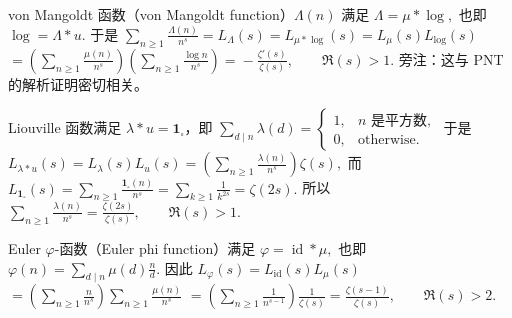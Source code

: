 \begin{example}
	von Mangoldt 函数（von Mangoldt function）$\Lambda(n)$ 满足
	\(\textstyle \Lambda=\allowbreak{}\mu*\log,\allowbreak{}\)
	也即
	\(\textstyle \log=\allowbreak{}\Lambda*u.\)
	于是
	\(\textstyle \sum_{n\geq\allowbreak{} 1}\frac{\Lambda(n)}{n^s} =\allowbreak{} L_\Lambda(s) =\allowbreak{} L_{\mu*\log}(s) =\allowbreak{} L_\mu(s)L_{\log}(s)\) \(\textstyle =\allowbreak{} \left(\sum_{n\geq\allowbreak{} 1}\frac{\mu(n)}{n^s}\right) \left(\sum_{n\geq\allowbreak{} 1}\frac{\log n}{n^s}\right) =\allowbreak{} -\frac{\zeta'(s)}{\zeta(s)},\allowbreak{} \qquad \Re(s)>1.\)
	旁注：这与 PNT 的解析证明密切相关。
\end{example}

\begin{example}
	Liouville 函数满足 $\lambda*u=\mathbf 1_{\square}$，即
	\(\textstyle \sum_{d\mid n}\lambda(d) = \begin{cases} 1, & n\text{ 是平方数},\\ 0, & \text{otherwise}. \end{cases}\)
	于是
	\(\textstyle L_{\lambda*u}(s)=\allowbreak{}L_\lambda(s)L_u(s) =\allowbreak{} \left(\sum_{n\geq\allowbreak{} 1}\frac{\lambda(n)}{n^s}\right)\zeta(s),\allowbreak{}\)
	而
	\(\textstyle L_{\mathbf 1_{\square}}(s) =\allowbreak{} \sum_{n\geq\allowbreak{} 1}\frac{\mathbf 1_{\square}(n)}{n^s} =\allowbreak{} \sum_{k\geq\allowbreak{} 1}\frac1{k^{2s}} =\allowbreak{} \zeta(2s).\)
	所以
	\(\textstyle \sum_{n\geq\allowbreak{} 1}\frac{\lambda(n)}{n^s} =\allowbreak{} \frac{\zeta(2s)}{\zeta(s)},\allowbreak{} \qquad \Re(s)>1.\)
\end{example}

\begin{example}
	Euler $\varphi$-函数（Euler phi function）满足
	\(\textstyle \varphi=\allowbreak{}\operatorname{id}*\mu,\allowbreak{}\)
	也即
	\(\textstyle \varphi(n)=\allowbreak{}\sum_{d\mid\allowbreak{} n}\mu(d)\frac{n}{d}.\)
	因此
	\(\textstyle L_\varphi(s) =\allowbreak{} L_{\operatorname{id}}(s)L_\mu(s)\) \(\textstyle =\allowbreak{} \left(\sum_{n\geq\allowbreak{} 1}\frac{n}{n^s}\right) \sum_{n\geq\allowbreak{} 1}\frac{\mu(n)}{n^s}\) \(\textstyle =\allowbreak{} \left(\sum_{n\geq\allowbreak{} 1}\frac1{n^{s-1}}\right) \frac1{\zeta(s)} =\allowbreak{} \frac{\zeta(s-1)}{\zeta(s)},\allowbreak{} \qquad \Re(s)>2.\)
\end{example}

